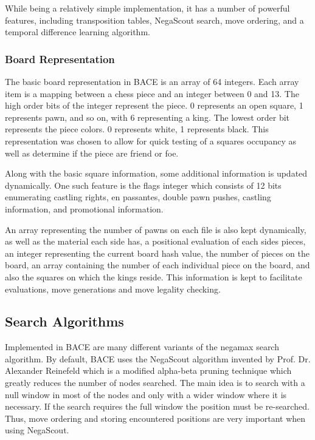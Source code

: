 \documentclass{article}
\begin{document}
While being a relatively simple implementation, it has a number of
powerful features, including transposition tables, NegaScout search,
move ordering, and a temporal difference learning algorithm.

\subsubsection{Board Representation}

The basic board representation in BACE is an array of 64 integers.
Each array item is a mapping between a chess piece and an integer
between 0 and 13.  The high order bits of the integer represent the
piece.  0 represents an open square, 1 represents pawn, and so on,
with 6 representing a king.  The lowest order bit represents the piece
colors.  0 represents white, 1 represents black.  
This representation was chosen to allow for quick testing of a squares
occupancy as well as determine if the piece are friend or foe.  

Along with the basic square information, some additional information
is updated dynamically.  One such feature is the flags integer which
consists of 12 bits 
enumerating castling rights, en passantes, double pawn pushes,
castling information, and promotional information.

An array representing the number of pawns on each file is also kept
dynamically, as well as the material each side has, a positional
evaluation of each sides pieces, an integer representing the current
board hash value, the number of pieces on the board, an array
containing the number of each individual piece on the board, and also
the squares on which the kings reside.  This information is kept to
facilitate evaluations, move generations and move legality checking.  

\subsection{Search Algorithms}

Implemented in BACE are many different variants of the negamax search
algorithm.  By default, BACE uses the NegaScout algorithm invented by
Prof. Dr. Alexander Reinefeld which is a
modified alpha-beta pruning technique which greatly reduces the number
of nodes searched.  The main idea is to search with a null window in
most of the nodes and only with a wider window where it is
necessary. If the search requires the full window the position must be
re-searched. Thus, move ordering and storing encountered positions are
very important when using NegaScout.
\end{document}
